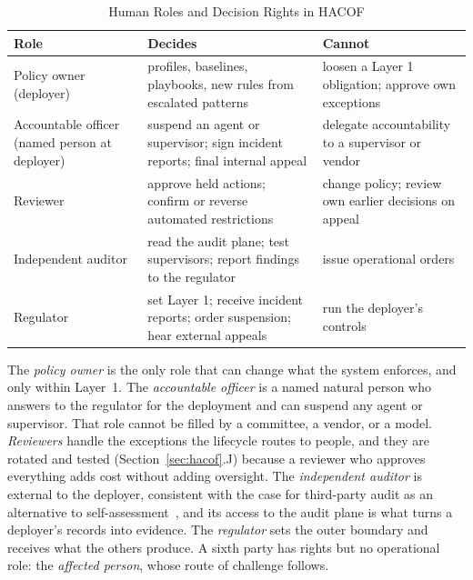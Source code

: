 \documentclass[journal]{IEEEtran}
\newcommand{\hacof}{HACOF}
\begin{document}
\begin{table}[!t]
\caption{Human Roles and Decision Rights in \hacof}
\label{tab:roles}
\centering
\footnotesize
\setlength{\tabcolsep}{3pt}
\begin{tabular}{>{\raggedright\arraybackslash}p{1.55cm}>{\raggedright\arraybackslash}p{2.85cm}>{\raggedright\arraybackslash}p{2.75cm}}
\toprule
\rowcolor{darkblue!15}
\textbf{Role} & \textbf{Decides} & \textbf{Cannot} \\
\midrule
Policy owner (deployer) & profiles, baselines, playbooks, new rules from escalated patterns & loosen a Layer 1 obligation; approve own exceptions \\
\rowcolor{darkblue!5}
Accountable officer (named person at deployer) & suspend an agent or supervisor; sign incident reports; final internal appeal & delegate accountability to a supervisor or vendor \\
Reviewer & approve held actions; confirm or reverse automated restrictions & change policy; review own earlier decisions on appeal \\
\rowcolor{darkblue!5}
Independent auditor & read the audit plane; test supervisors; report findings to the regulator & issue operational orders \\
Regulator & set Layer 1; receive incident reports; order suspension; hear external appeals & run the deployer's controls \\
\bottomrule
\end{tabular}
\end{table}

The \textit{policy owner} is the only role that can change what the system enforces, and only within Layer~1. The \textit{accountable officer} is a named natural person who answers to the regulator for the deployment and can suspend any agent or supervisor. That role cannot be filled by a committee, a vendor, or a model. \textit{Reviewers} handle the exceptions the lifecycle routes to people, and they are rotated and tested (Section~\ref{sec:hacof}.J) because a reviewer who approves everything adds cost without adding oversight. The \textit{independent auditor} is external to the deployer, consistent with the case for third-party audit as an alternative to self-assessment~\cite{brundage2020trustworthy},
and its access to the audit plane is what turns a deployer's records into evidence. The \textit{regulator} sets the outer boundary and receives what the others produce. A sixth party has rights but no operational role: the \textit{affected person}, whose route of challenge follows.
\end{document}
